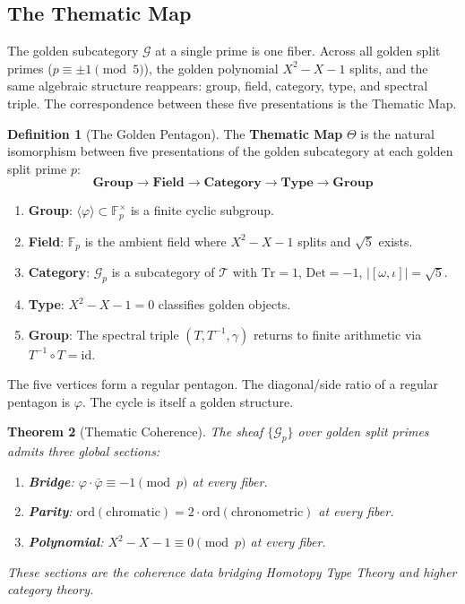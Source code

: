 \documentclass[12pt,oneside]{article}
\theoremstyle{principia}
\newtheorem{theorem}{Theorem}[section]
\theoremstyle{definition}
\newtheorem{definition}[theorem]{Definition}
\theoremstyle{remark}
\providecommand{\FF}{\mathbb{F}}
\providecommand{\GG}{\mathcal{G}}
\providecommand{\TT}{\mathcal{T}}
\providecommand{\vp}{\varphi}
\providecommand{\vpbar}{\bar{\varphi}}
\begin{document}
\subsection{The Thematic Map}

The golden subcategory $\GG$ at a single prime is one fiber. Across all golden split primes ($p \equiv \pm 1 \pmod{5}$), the golden polynomial $X^2 - X - 1$ splits, and the same algebraic structure reappears: group, field, category, type, and spectral triple. The correspondence between these five presentations is the Thematic Map.

\begin{definition}[The Golden Pentagon]\label{def:pentagon}
The \textbf{Thematic Map} $\Theta$ is the natural isomorphism between five presentations of the golden subcategory at each golden split prime $p$:
$$\textbf{Group} \to \textbf{Field} \to \textbf{Category} \to \textbf{Type} \to \textbf{Group}$$
\begin{enumerate}
\item \textbf{Group}: $\langle\vp\rangle \subset \FF_p^\times$ is a finite cyclic subgroup.
\item \textbf{Field}: $\FF_p$ is the ambient field where $X^2 - X - 1$ splits and $\sqrt{5}$ exists.
\item \textbf{Category}: $\GG_p$ is a subcategory of $\TT$ with $\mathrm{Tr} = 1$, $\mathrm{Det} = -1$, $|[\omega,\iota]| = \sqrt{5}$.
\item \textbf{Type}: $X^2 - X - 1 = 0$ classifies golden objects.
\item \textbf{Group}: The spectral triple $(T, T^{-1}, \gamma)$ returns to finite arithmetic via $T^{-1} \circ T = \mathrm{id}$.
\end{enumerate}
The five vertices form a regular pentagon. The diagonal/side ratio of a regular pentagon is $\vp$. The cycle is itself a golden structure.
\end{definition}

\begin{theorem}[Thematic Coherence]
The sheaf $\{\GG_p\}$ over golden split primes admits three global sections:
\begin{enumerate}
\item \textbf{Bridge}: $\vp \cdot \vpbar \equiv -1 \pmod{p}$ at every fiber.
\item \textbf{Parity}: $\mathrm{ord}(\text{chromatic}) = 2 \cdot \mathrm{ord}(\text{chronometric})$ at every fiber.
\item \textbf{Polynomial}: $X^2 - X - 1 \equiv 0 \pmod{p}$ at every fiber.
\end{enumerate}
These sections are the coherence data bridging Homotopy Type Theory and higher category theory.
\end{theorem}
\end{document}
